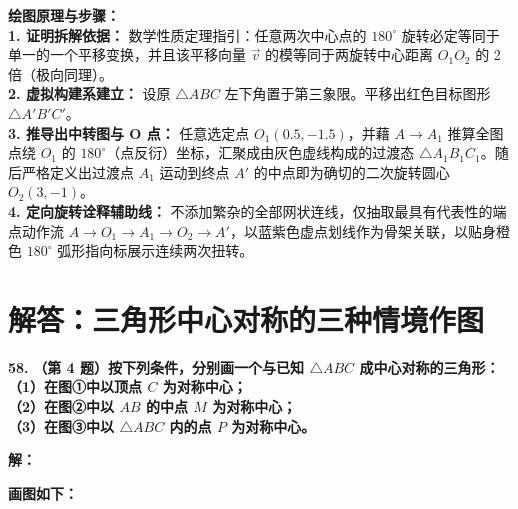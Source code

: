 \vspace{0.4cm}
{\small\color{blue!70!black}
\textbf{绘图原理与步骤：}\\
\textbf{1. 证明拆解依据：} 数学性质定理指引：任意两次中心点的 $180^\circ$ 旋转必定等同于单一的一个平移变换，并且该平移向量 $\vec{v}$ 的模等同于两旋转中心距离 $O_1 O_2$ 的 2 倍（极向同理）。\\
\textbf{2. 虚拟构建系建立：} 设原 $\triangle ABC$ 左下角置于第三象限。平移出红色目标图形 $\triangle A'B'C'$。\\
\textbf{3. 推导出中转图与 O 点：} 任意选定点 $O_1(0.5, -1.5)$，并藉 $A \to A_1$ 推算全图点绕 $O_1$ 的 $180^\circ$（点反衍）坐标，汇聚成由灰色虚线构成的过渡态 $\triangle A_1B_1C_1$。随后严格定义出过渡点 $A_1$ 运动到终点 $A'$ 的中点即为确切的二次旋转圆心 $O_2(3,-1)$。\\
\textbf{4. 定向旋转诠释辅助线：} 不添加繁杂的全部网状连线，仅抽取最具有代表性的端点动作流 $A \to O_1 \to A_1 \to O_2 \to A'$，以蓝紫色虚点划线作为骨架关联，以贴身橙色 $180^\circ$ 弧形指向标展示连续两次扭转。
}

\newpage



\newpage

\section{解答：三角形中心对称的三种情境作图}

\vspace{0.6cm}

\textbf{\LARGE 58.} \textbf{（第 4 题）按下列条件，分别画一个与已知 $\triangle ABC$ 成中心对称的三角形：\\
（1）在图①中以顶点 $C$ 为对称中心；\\
（2）在图②中以 $AB$ 的中点 $M$ 为对称中心；\\
（3）在图③中以 $\triangle ABC$ 内的点 $P$ 为对称中心。}

\vspace{0.4cm}
\textbf{解：}

\textbf{画图如下：}

